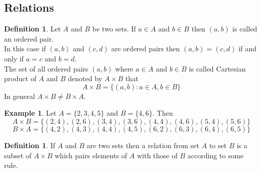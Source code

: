 \documentclass[11pt,a4paper]{article}
\theoremstyle{definition}
\newtheorem{definition}[thm]{Definition}
\newtheorem{example}[thm]{Example}
\begin{document}
\subsection{Relations}
\begin{definition}
 Let $A$ and $B$ be two sets. If $a\in A$ and $b\in B$ then $(a,b)$ is called an ordered pair.\\
In this case if $(a,b)$ and $(c,d)$ are ordered pairs then $(a,b)=(c,d)$ if and only if $a=c$ and $b=d$.\\

The set of all ordered pairs $(a,b)$ where $a\in A$ and $b\in B$ is called Cartesian product of $A$ and $B$ denoted by $A\times B$ that $$ A\times B = \{(a,b):a\in A, b\in B\}$$ In general $A\times B \neq B\times A$.
\end{definition}
\begin{example}

Let $A=\{2,3,4,5\}$ and $B=\{4,6\}$. Then 
$$A\times B =\{(2,4),(2,6),(3,4),(3,6),(4,4),(4,6),(5,4),(5,6)\}$$
$$B\times A= \{(4,2),(4,3),(4,4),(4,5),(6,2),(6,3),(6,4),(6,5)\}$$
\end{example}
\begin{definition}
 If $A$ and $B$ are two sets then a relation from set $A$ to set $B$ is a subset of $A\times B$ which pairs elements of $A$ with those of $B$ according to some rule.
\end{definition}
\end{document}
